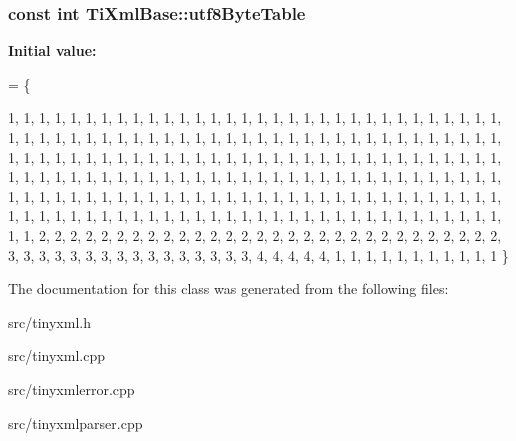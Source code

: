 \subsubsection[{\texorpdfstring{utf8\+Byte\+Table}{utf8ByteTable}}]{\setlength{\rightskip}{0pt plus 5cm}const int Ti\+Xml\+Base\+::utf8\+Byte\+Table\hspace{0.3cm}{\ttfamily [static]}}\hypertarget{classTiXmlBase_ac8c86058137bdb4b413c3eca58f2d467}{}\label{classTiXmlBase_ac8c86058137bdb4b413c3eca58f2d467}
{\bfseries Initial value\+:}
\begin{DoxyCode}
= 
\{
    
        1,  1,  1,  1,  1,  1,  1,  1,  1,  1,  1,  1,  1,  1,  1,  1,  
        1,  1,  1,  1,  1,  1,  1,  1,  1,  1,  1,  1,  1,  1,  1,  1,  
        1,  1,  1,  1,  1,  1,  1,  1,  1,  1,  1,  1,  1,  1,  1,  1,  
        1,  1,  1,  1,  1,  1,  1,  1,  1,  1,  1,  1,  1,  1,  1,  1,  
        1,  1,  1,  1,  1,  1,  1,  1,  1,  1,  1,  1,  1,  1,  1,  1,  
        1,  1,  1,  1,  1,  1,  1,  1,  1,  1,  1,  1,  1,  1,  1,  1,  
        1,  1,  1,  1,  1,  1,  1,  1,  1,  1,  1,  1,  1,  1,  1,  1,  
        1,  1,  1,  1,  1,  1,  1,  1,  1,  1,  1,  1,  1,  1,  1,  1,  
        1,  1,  1,  1,  1,  1,  1,  1,  1,  1,  1,  1,  1,  1,  1,  1,  
        1,  1,  1,  1,  1,  1,  1,  1,  1,  1,  1,  1,  1,  1,  1,  1,  
        1,  1,  1,  1,  1,  1,  1,  1,  1,  1,  1,  1,  1,  1,  1,  1,  
        1,  1,  1,  1,  1,  1,  1,  1,  1,  1,  1,  1,  1,  1,  1,  1,  
        1,  1,  2,  2,  2,  2,  2,  2,  2,  2,  2,  2,  2,  2,  2,  2,  
        2,  2,  2,  2,  2,  2,  2,  2,  2,  2,  2,  2,  2,  2,  2,  2,  
        3,  3,  3,  3,  3,  3,  3,  3,  3,  3,  3,  3,  3,  3,  3,  3,  
        4,  4,  4,  4,  4,  1,  1,  1,  1,  1,  1,  1,  1,  1,  1,  1   
\}
\end{DoxyCode}


The documentation for this class was generated from the following files\+:\begin{DoxyCompactItemize}
\item 
src/tinyxml.\+h\item 
src/tinyxml.\+cpp\item 
src/tinyxmlerror.\+cpp\item 
src/tinyxmlparser.\+cpp\end{DoxyCompactItemize}
